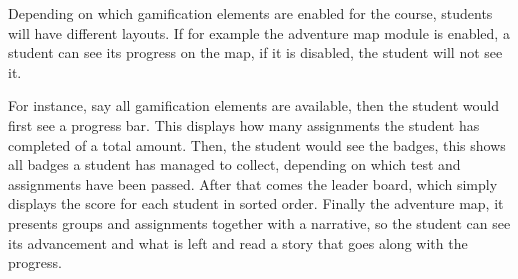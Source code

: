 Depending on which gamification elements are enabled for the course, students will have different layouts. If for example the adventure map module is enabled, a student can see its progress on the map, if it is disabled, the student will not see it.

For instance, say all gamification elements are available, then the student would first see a progress bar. This displays how many assignments the student has completed of a total amount. Then, the student would see the badges, this shows all badges a student has managed to collect, depending on which test and assignments have been passed. After that comes the leader board, which simply displays the score for each student in sorted order. Finally the adventure map, it presents groups and assignments together with a narrative, so the student can see its advancement and what is left and read a story that goes along with the progress.
